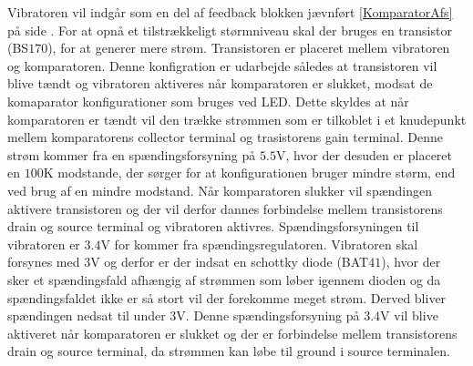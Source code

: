  Vibratoren vil indgår som en del af feedback blokken jævnført \ref{KomparatorAfs} på side \pageref{KomparatorAfs}. For at opnå et tilstrækkeligt størmniveau skal der bruges en transistor (BS$170$), for at generer mere strøm. Transistoren er placeret mellem vibratoren og komparatoren. Denne konfigration er udarbejde således at transistoren vil blive tændt og vibratoren aktiveres når komparatoren er slukket, modsat de komaparator konfigurationer som bruges ved LED. Dette skyldes at når komparatoren er tændt vil den trække strømmen   som er tilkoblet i et knudepunkt mellem komparatorens collector terminal og trasistorens gain terminal. Denne strøm kommer fra en spændingsforsyning på $5.5$V, hvor der desuden er placeret en $100$K modstande, der sørger for at konfigurationen bruger mindre størm, end ved brug af en mindre modstand. Når komparatoren slukker vil spændingen aktivere transistoren og der vil derfor dannes forbindelse mellem transistorens drain og source terminal og vibratoren aktivres. Spændingsforsyningen til vibratoren er $3.4$V for kommer fra spændingsregulatoren. Vibratoren skal forsynes med $3$V og derfor er der indsat en schottky diode (BAT$41$), hvor der sker et spændingsfald afhængig af strømmen som løber igennem dioden og da spændingsfaldet ikke er så stort vil der forekomme meget strøm. Derved bliver spændingen nedsat til under $3$V. Denne spændingsforsyning på $3.4$V vil blive aktiveret når komparatoren er slukket og der er forbindelse mellem transistorens drain og source terminal, da strømmen kan løbe til ground i source terminalen. 


